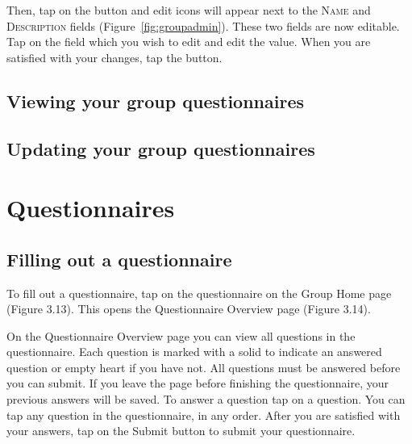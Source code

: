 \documentclass[a4paper,11pt,titlepage]{scrartcl}
\newcommand{\textvar}[1]{{\textsc{#1}}}
\newcommand{\textaction}[1]{{\fontfamily{cmtt}\selectfont#1}}
\newcommand{\action}[1]{\textaction{#1}}
\newcommand*{\fileMatchingTypeOne}{question-matching-1}
\newcommand*{\fileMatchingTypeTwo}{question-matching-2}
\newcommand*{\fileQuestion}{question-editing}
\newcommand*{\fileQuestionnaire}{questionnaire-details}
\newcommand*{\fileQuestions}{questionnaire-questions}
\newcommand*{\fileQuestionnaires}{questionnaires}
\newcommand*{\fileWeighting}{question-weighting}
\newcommand*{\fileCategories}{categories}
\newcommand*{\AssetsPath}{../assets}%
\newcommand{\appscreenshot}[4]{
}
\begin{document}
Then, \action{tap} on the  button and edit icons will appear next to the \textvar{Name} and \textvar{Description} fields (Figure~\ref{fig:groupadmin}). These two fields are now editable. \action{Tap} on the field which you wish to edit and edit the value.  When you are satisfied with your changes, \action{tap} the  button.

\subsection{Viewing your group questionnaires}
\label{sec:group-questionnaire}

\subsection{Updating your group questionnaires}
\label{sec:group-questionnaire-edit}

\clearpage
\section{Questionnaires}
\label{sec:questionnaires}
\appscreenshot{\fileMatchingTypeOne}{Question Weights}{Set a weighting value for the answer options of a question}{fig:questionweight}
\appscreenshot{\fileMatchingTypeTwo}{Option Weights}{Set weighting values for each answer option}{fig:optionweight}
\appscreenshot{\fileQuestion}{Question}{Create a question for your questionnaire}{fig:question}
\appscreenshot{\fileQuestionnaire}{Questionnaire}{Construct your questionnaire for an event or group}{fig:questionnaire}
\appscreenshot{\fileQuestions}{Questions}{View the questions of your questionnaire}{fig:questions}
\appscreenshot{\fileQuestionnaires}{Questionnaires}{Manage your questionnaires}{fig:questionnaires}
\appscreenshot{\fileWeighting}{Weighting}{Weight answer options based on their importance}{fig:weighting}
\appscreenshot{\fileCategories}{Categories}{Use categories to group similar questions}{fig:categories}
\subsection{Filling out a questionnaire}
\label{sec:questionnaire-fill}
To fill out a questionnaire, tap on the questionnaire on the Group Home page (Figure 3.13). This opens the Questionnaire Overview page (Figure 3.14). 

On the Questionnaire Overview page you can view all questions in the questionnaire.  Each question is marked with a solid   to indicate an answered question or empty heart   if you have not.  All questions must be answered before you can submit.  If you leave the page before finishing the questionnaire, your previous answers will be saved. To answer a question tap on a question.  You can tap any question in the questionnaire, in any order.  After you are satisfied with your answers, tap on the Submit button to submit your questionnaire.  
\end{document}
